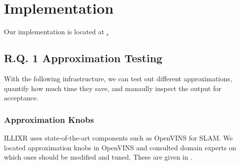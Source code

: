 \section{Implementation}

Our implementation is located at \href{https://github.com/ILLIXR/ILLIXR/tree/illixr-testing}.

\subsection{R.Q. 1 Approximation Testing}

With the following infrastructure, we can test out different approximations, quantify how much time they save, and manaully inspect the output for acceptance.

\subsubsection{Approximation Knobs}

ILLIXR uses state-of-the-art components such as OpenVINS \cite{Geneva2020ICRA} for SLAM. We located approximation knobs in OpenVINS and consulted domain experts on which ones should be modified and tuned. These are given in
.




